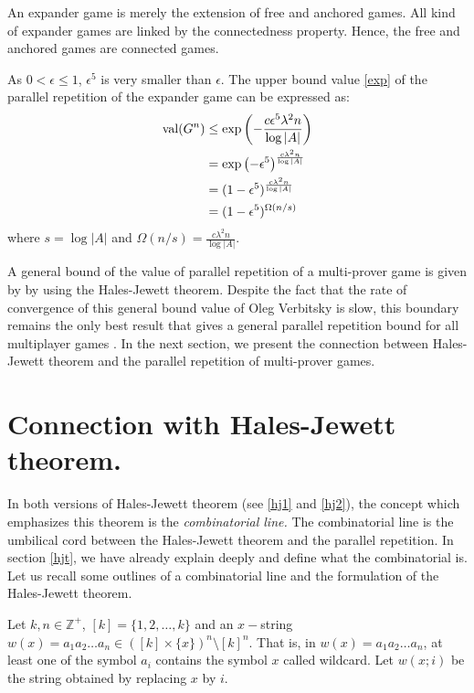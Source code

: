 An expander game is  merely the extension of free and anchored games. All kind of expander games are linked by the connectedness property. Hence, the free and anchored games are connected games. 

As $0 < \epsilon \leq 1$, $\epsilon^5$ is very smaller than $\epsilon$. The upper bound value \eqref{exp} of the parallel repetition of the expander game can be expressed as:
\begin{align*}
\mathrm{val} (G^n) & \leq \exp \left(-\frac{c \epsilon^5 \lambda^2 n }{\log |A|}\right) \\
& =\exp \left(-\epsilon^5\right)^{\frac{c  \lambda^2 n }{\log |A|}} \\
& =(1-\epsilon^5)^{ \frac{c  \lambda^2 n }{\log |A|}} \\
& =(1-\epsilon^5)^{ \Omega(n/s)}
\end{align*}
where $s=\log |A|$ and $\Omega(n/s)=\frac{c  \lambda^2 n }{\log |A|}.$

A general bound of the value of parallel repetition of a multi-prover game is  given by  \cite{verbitsky1996towards} by using the Hales-Jewett theorem. Despite the fact that the rate of  convergence of this general bound value of Oleg Verbitsky is slow, this boundary  remains the only best result that gives a general parallel repetition bound for all multiplayer games \citep{hkazla2016forbidden,dinur2016multiplayer}. In the next section, we present the connection between Hales-Jewett theorem and the parallel repetition of  multi-prover games. 

\section{Connection with Hales-Jewett theorem.}

In both versions of Hales-Jewett theorem (see \eqref{hj1} and \eqref{hj2}), the concept which emphasizes this theorem is the \textit{combinatorial line.} The combinatorial line is the umbilical cord between the Hales-Jewett theorem and the parallel repetition. In section \eqref{hjt}, we have already explain deeply and define what the combinatorial is. Let us recall some outlines of a combinatorial line and the formulation of the Hales-Jewett theorem.

Let $k, n\in \mathbb{Z}^+$, $[k]=\{1,2, \ldots,k\}$ and an $x-$string $w(x)=a_1a_2\ldots a_n \in ([k]\times\{x\})^n\setminus [k]^n.$ That is, in $w(x)=a_1a_2\ldots a_n$, at least one of the symbol   $a_i$ contains the symbol  $x$ called wildcard. Let $w(x;i)$ be the string obtained by replacing $x$ by $i$.

